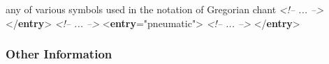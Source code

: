 \begin{shaded}
\mbox{}\newline 
{}\mbox{}\newline 
\hspace*{1em}any of various symbols used in the notation of Gregorian chant \mbox{}\newline 
\textit{<!-- ... -->}\mbox{}\newline 
\hspace*{1em}\mbox{}\newline 
{}\mbox{}\newline 
{</\textbf{entry}>}\mbox{}\newline 
\textit{<!-- ... -->}\mbox{}\newline 
{<\textbf{entry}\hspace*{1em}{xml:id}="{pneumatic}">}\mbox{}\newline 
{}\mbox{}\newline 
\textit{<!-- ... -->}\mbox{}\newline 
{}\mbox{}\newline 
{</\textbf{entry}>}\end{shaded}\egroup\par 
\subsubsection[{Other Information}]{Other Information}\label{DITPMI}
